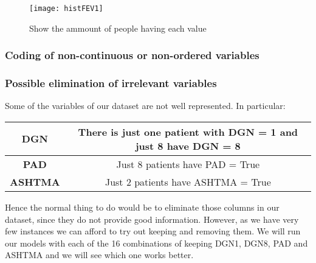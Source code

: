 

\begin{figure}[bh]
\centering
\texttt{[image: histFEV1]}
\label{fig:histFEV1}
\caption{Show the ammount of people having each value}
\end{figure}
\subsubsection{Coding of non-continuous or non-ordered variables}




\subsubsection{Possible elimination of irrelevant variables}

Some of the variables of our dataset are not well represented. In particular:

\begin{center}
\begin{tabular}{|c|c|}
  \hline
  \textbf{DGN} & There is just one patient with DGN = 1 and just 8 have DGN = 8 \\
  \hline
  \textbf{PAD} & Just 8 patients have PAD = True \\
  \hline
  \textbf{ASHTMA} & Just 2 patients have ASHTMA = True \\
  \hline
\end{tabular}
\end{center}

Hence the normal thing to do would be to eliminate those columns in our dataset,
since they do not provide good information. However, as we have very few instances
we can afford to try out keeping and removing them. We will run our models with
each of the 16 combinations of keeping DGN1, DGN8, PAD and ASHTMA and we will
see which one works better.

